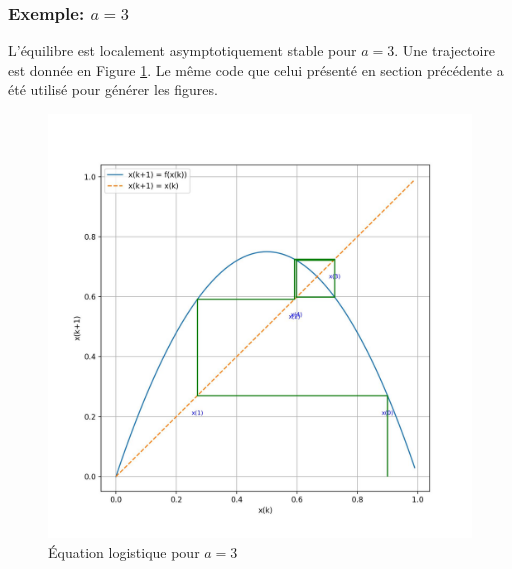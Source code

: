             \subsubsection{Exemple: $a = 3$}
                L’équilibre est localement asymptotiquement stable pour $a = 3$.
                Une trajectoire est donnée en Figure \ref{fig:logistique_differences_5}. Le même code que celui présenté en section précédente a été utilisé pour générer les figures.
                \begin{figure}[ht!]
                    \centering
                    \includegraphics[width=\textwidth]{images/logistique_differences_5.jpg}
                    \caption{Équation logistique pour $a=3$}
                    \label{fig:logistique_differences_5}
                \end{figure}
            
